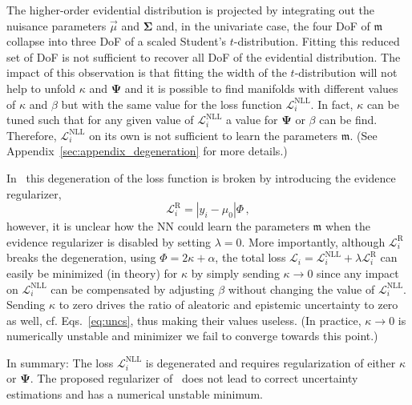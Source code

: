 \documentclass{article}
\begin{document}
The higher-order evidential distribution is projected by integrating out the nuisance parameters $\vec{\mu}$ and $\bm{\Sigma}$ and, in the univariate case, the four DoF of $\mathfrak{m}$ collapse into three DoF of a scaled Student's $t$-distribution.
Fitting this reduced set of DoF is not sufficient to recover all DoF of the evidential distribution.
The impact of this observation is that fitting the width of the $t$-distribution will not help to unfold $\kappa$ and $\bm{\Psi}$ and it is possible to find manifolds with different values of $\kappa$ and $\beta$ but with the same value for the loss function $\mathcal{L}_i^\text{NLL}$.
In fact, $\kappa$ can be tuned such that for any given value of $\mathcal{L}_i^\text{NLL}$ a value for $\bm{\Psi}$ or $\beta$ can be find.
Therefore, $\mathcal{L}_i^\text{NLL}$ on its own is not sufficient to learn the parameters $\mathfrak{m}$.
(See Appendix~\ref{sec:appendix_degeneration} for more details.)

In~\cite{amini20} this degeneration of the loss function is broken by introducing the evidence regularizer,
\begin{equation}
    \mathcal{L}_i^\text{R} = |y_i - \mu_0| \Phi \,,
\end{equation}
however, it is unclear how the NN could learn the parameters $\mathfrak{m}$ when the evidence regularizer is disabled by setting $\lambda = 0$.
More importantly, although $\mathcal{L}_i^\text{R}$ breaks the degeneration, using $\Phi = 2\kappa + \alpha$, the total loss $\mathcal{L}_i = \mathcal{L}_i^\text{NLL} + \lambda \mathcal{L}_i^\text{R}$ can easily be minimized (in theory) for $\kappa$ by simply sending $\kappa \to 0$ since any impact on $\mathcal{L}_i^\text{NLL}$ can be compensated by adjusting $\beta$ without changing the value of $\mathcal{L}_i^\text{NLL}$.
Sending $\kappa$ to zero drives the ratio of aleatoric and epistemic uncertainty to zero as well, cf. Eqs.~\eqref{eq:uncs}, thus making their values useless.
(In practice, $\kappa \to 0$ is numerically unstable and minimizer we fail to converge towards this point.)

In summary: The loss $\mathcal{L}_i^\text{NLL}$ is degenerated and requires regularization of either $\kappa$ or $\bm{\Psi}$.
The proposed regularizer of~\cite{amini20} does not lead to correct uncertainty estimations and has a numerical unstable minimum.
\end{document}
